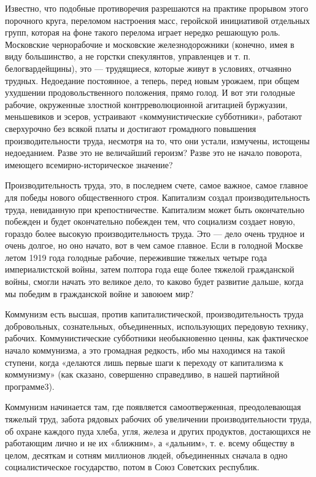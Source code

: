\documentclass[12pt]{article}
\newcommand{\parnum}{(\arabic{parcount})}
\newcounter{parcount}
\newenvironment{parnumbers}{%
  \par%
  \everypar{\noindent \stepcounter{parcount}\marginpar[]{\parnum}}%
}{}
\begin{document}
\begin{parnumbers}
Известно, что подобные противоречия разрешаются на практике прорывом этого порочного круга, переломом настроения масс, геройской инициативой отдельных групп, которая на фоне такого перелома играет нередко решающую роль. Московские чернорабочие и московские железнодорожники (конечно, имея в виду большинство, а не горстки спекулянтов, управленцев и т. п. белогвардейщины), это — трудящиеся, которые живут в условиях, отчаянно трудных. Недоедание постоянное, а теперь, перед новым урожаем, при общем ухудшении продовольственного положения, прямо голод. И вот эти голодные рабочие, окруженные злостной контрреволюционной агитацией буржуазии, меньшевиков и эсеров, устраивают «коммунистические субботники», работают сверхурочно без всякой платы и достигают громадного повышения производительности труда, несмотря на то, что они устали, измучены, истощены недоеданием. Разве это не величайший героизм? Разве это не начало поворота, имеющего всемирно-историческое значение?

Производительность труда, это, в последнем счете, самое важное, самое главное для победы нового общественного строя. Капитализм создал производительность труда, невиданную при крепостничестве. Капитализм может быть окончательно побежден и будет окончательно побежден тем, что социализм создает новую, гораздо более высокую производительность труда. Это — дело очень трудное и очень долгое, но оно начато, вот в чем самое главное. Если в голодной Москве летом 1919 года голодные рабочие, пережившие тяжелых четыре года империалистской войны, затем полтора года еще более тяжелой гражданской войны, смогли начать это великое дело, то каково будет развитие дальше, когда мы победим в гражданской войне и завоюем мир?

Коммунизм есть высшая, против капиталистической, производительность труда добровольных, сознательных, объединенных, использующих передовую технику, рабочих. Коммунистические субботники необыкновенно ценны, как фактическое начало коммунизма, а это громадная редкость, ибо мы находимся на такой ступени, когда «делаются лишь первые шаги к переходу от капитализма к коммунизму» (как сказано, совершенно справедливо, в нашей партийной программе3).

Коммунизм начинается там, где появляется самоотверженная, преодолевающая тяжелый труд, забота рядовых рабочих об увеличении производительности труда, об охране каждого пуда хлеба, угля, железа и других продуктов, достающихся не работающим лично и не их «ближним», а «дальним», т. е. всему обществу в целом, десяткам и сотням миллионов людей, объединенных сначала в одно социалистическое государство, потом в Союз Советских республик.


\end{parnumbers}
\end{document}
